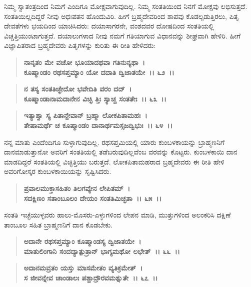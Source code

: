 ನಿಮ್ಮ ಸ್ವಾತಂತ್ರದಿಂದ ನಿಮಗೆ ಎಂದಿಗೂ ಮೋಕ್ಷವಾಗುವುದಿಲ್ಲ. ನಿಮ್ಮ ಸಂತತಿಯಿಂದ ನಿನಗೆ ಮೋಕ್ಷವು ಲಭಿಸುತ್ತದೆ. ಸಂತತಿಯಿಲ್ಲದಿದ್ದರೆ ನೀವು ಅಧಃಪತನ ಹೊಂದುವಿರಿ. ಹೀಗೆ ಬ್ರಹ್ಮದೇವರಿಂದ ಶಾಪವು ಕೊಡಲ್ಪಡುತ್ತಿರಲು, ಪಿತೃ ದೇವತೆಗಳು ಭಯದಿಂದ ಯಾಚಿಸಿದರು: ದಯಾಸಾಗರನೇ, ವಂಶದವರ ದೋಷದಿಂದ ಸಂತತಿಯಲ್ಲಿ ವಿಚ್ಚತ್ತಿಯುಂಟಾಗುತ್ತದೆ. ದಯಾಲು\-ಗಳಾದ ನೀವು ನಮಗೆ ಗತಿಯಾಗುವ ವಿಧಾನವನ್ನು ಶೀಘ್ರವಾಗಿ ಹೇಳಿರಿ. ಹೀಗೆ ವಿಜ್ಞಾಪಿತರಾದ ಬ್ರಹ್ಮದೇವರು ಪಿತೃಗಳನ್ನು ಕುರಿತು ಈ ರೀತಿ ಹೇಳಿದರು:

\begin{verse}
\textbf{ನಾನೃತಂ ಮೇ ವಚೋ ಭೂಯಾದಥವಾ ಗತಿನುನ್ಯಥಾ~।}\\\textbf{ಕೂಷ್ಮಾಂಡಂ ರಥಸಪ್ತಮ್ಯಾಂ ಯೋ ದದಾತಿ ದ್ವಿಜಾತಯೇ~।। ೬೨~।। }
\end{verse}

\begin{verse}
\textbf{ನ ತಸ್ಯ ಸಂತತಿಚ್ಛೇದೋ ಭವೇದಿತಿ ವರಂ ದದ್~।}\\\textbf{ಕೂಷ್ಮಾಂಡಾನಾಮದಾನೇನ ವಿಚ್ಛಿ ತ್ತಿಃ ಸ್ಯಾಚ್ಚ ಸಂತತೇಃ~।। ೬೩~।। }
\end{verse}

\begin{verse}
\textbf{ಇತ್ಯಾಶ್ವಾ ಸ್ಯ ಪಿತಾನ್ದೇವಾನ್ ಬ್ರಹ್ಮಾ ಲೋಕಪಿತಾಮಹಃ~।}\\\textbf{ತೇಷಾಮರ್ಥೆ ಚ ಕೂಷ್ಮಾಂಡಂ ದಾನಾರ್ಥಮಸ್ಸಜದ್ವಿಭುಃ~।। ೬೪~।।}
\end{verse}

ನನ್ನ ಮಾತು ಎಂದೆಂದಿಗೂ ಸುಳ್ಳಾಗುವುದಿಲ್ಲ. ರಥಸಪ್ತಮಿಯಲ್ಲಿ ಯಾರು ಕುಂಬಳ\-ಕಾಯನ್ನು ಬ್ರಾಹ್ಮಣನಿಗೆ ದಾನಮಾಡುತ್ತಾನೋ ಅವರಿಗೆ ಸಂತತಿಯಲ್ಲಿ ತಡೆಬರುವುದಿಲ್ಲವೆಂಬ ವರವನ್ನು ಕೊಟ್ಟರು. ಕುಂಬಳಕಾಯಿ ದಾನ ಮಾಡದಿದ್ದರೆ ಸಂತತಿಯಲ್ಲಿ ವಿಚ್ಛಿತ್ತಿಯು ಬರುತ್ತದೆ. ಲೋಕಪಿತಾಮಹರಾದ ಬ್ರಹ್ಮದೇವರು ಈ ರೀತಿ ಹೇಳಿ ಅವರಿಗೋಸ್ಕರ ಕುಂಬಳಕಾಯಿಯನ್ನು ಸೃಷ್ಟಿಸಿದರು.

\begin{verse}
\textbf{ಪ್ರವಾಲಮುಕ್ತಾಸಹಿತಂ ತಿಲಗವ್ಯೇನ ಲೇಪಿತಮ್~।}\\\textbf{ಸದಕ್ಷಿಣಂ ಸತಾಂಬೂಲಂ ದೇಯಂ ಸಂತತಿಮಿಚ್ಛತಾ~।। ೬೫~।।}
\end{verse}

ಸಂತತಿ ಇಚ್ಛೆಯುಳ್ಳವರು ಹಾಲು-ಮೊಸರು-ಎಳ್ಳುಗಳಿಂದ ಲೇಪನ ಮಾಡಿ, ಮುತ್ತುಗಳಿಂದ ಅಲಂಕರಿಸಿ ದಕ್ಷಿಣೆ ತಾಂಬೂಲ ಸಹಿತ ಬ್ರಾಹ್ಮಣನಿಗೆ ದಾನ ಕೊಡಬೇಕು.

\begin{verse}
\textbf{ಅದಾನೇ ರಥಸಪ್ತಮ್ಯಾಂ ಕೂಷ್ಮಾಂಡಸ್ಯ ದ್ವಿಜಾತಯೇ~।}\\\textbf{ಮಾತುಲಿಂಗಾನಿ ಸಂದದ್ಯಾತ್ಪುತ್ರಾನ್ ಭಾಗ್ಯಮಥೋ ಲಭೇತ್~।। ೬೬~।।} 
\end{verse}

\begin{verse}
\textbf{ಅದಾನಮವ್ರತಂ ಯಸ್ತು ಮಾಸಮೇತಂ ವ್ಯತಿಕ್ರಮೇತ್~।}\\\textbf{ಸ ಜೀವನ್ನೇವ ಚಾಂಡಾಲಃ ಪಶ್ಚಾದ್ರೌರವಮಶ್ನುತೇ~।। ೬೭~।। }
\end{verse}

